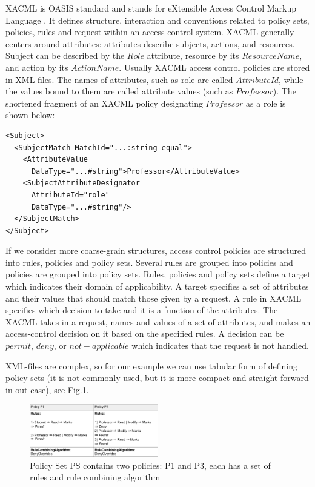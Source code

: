\documentclass{acm_proc_article-sp}
\begin{document}
XACML is OASIS standard and stands for eXtensible Access Control Markup Language \cite{oasis:xacml}. It defines structure, interaction and conventions related to policy sets, policies, rules and request within an access control system. XACML generally centers around attributes: attributes describe subjects, actions, and resources. Subject can be described by the $Role$ attribute, resource by its $ResourceName$, and action by its $ActionName$. Usually XACML access control policies are stored in XML files. The names of attributes, such as role are called $AttributeId$, while the values bound
to them are called attribute values  (such as $Professor$). The shortened fragment of an XACML policy designating $Professor$ as a role is shown below:\\

\begin{verbatim}
<Subject>
  <SubjectMatch MatchId="...:string-equal">
    <AttributeValue
      DataType="...#string">Professor</AttributeValue>
    <SubjectAttributeDesignator
      AttributeId="role"
      DataType="...#string"/>
  </SubjectMatch>
</Subject>
\end{verbatim}

If we consider more coarse-grain structures, access control policies are structured into rules, policies and policy sets. Several rules are grouped into policies and policies are grouped into policy sets. Rules, policies and policy sets define a target which indicates their domain of applicability. A target specifies a set of attributes and their values that should match those given by a request. A rule in XACML specifies which decision to take and it is a function of the attributes. The XACML takes in a request, names and values of a set of attributes, and makes an access-control decision on it based on the specified rules. A decision can be $permit$, $deny$, or $not-applicable$ which indicates that the request is not handled. 

XML-files are complex, so for our example we can use tabular form of defining policy sets (it is not commonly used, but it is more compact and straight-forward in out case), see Fig.\ref{fig:policyset}.

\begin{figure}[h]
\includegraphics[width=0.5\textwidth]{policyset.png}
\caption{Policy Set PS contains two policies: P1 and P3, each has a set of rules and rule combining algorithm}    
  \label{fig:policyset}
\end{figure}
\end{document}
